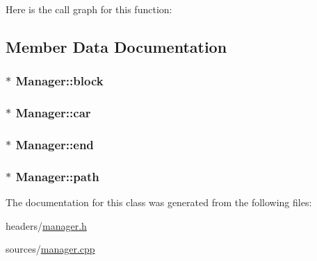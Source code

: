 Here is the call graph for this function\-:




\subsection{Member Data Documentation}
\hypertarget{class_manager_a9301f6e9bd2feee2719b2ff82b49a85e}{
\subsubsection[{block}]{$\ast$ Manager\-::block}}\label{class_manager_a9301f6e9bd2feee2719b2ff82b49a85e}
\hypertarget{class_manager_a2803dff8e8f2912242f4098991d91415}{
\subsubsection[{car}]{$\ast$ Manager\-::car}}\label{class_manager_a2803dff8e8f2912242f4098991d91415}
\hypertarget{class_manager_aec87028a71ab7b031977ac12a086658d}{
\subsubsection[{end}]{$\ast$ Manager\-::end}}\label{class_manager_aec87028a71ab7b031977ac12a086658d}
\hypertarget{class_manager_ad9b3bf0343fe49922b1874dcb2b5c6ca}{
\subsubsection[{path}]{$\ast$ Manager\-::path}}\label{class_manager_ad9b3bf0343fe49922b1874dcb2b5c6ca}


The documentation for this class was generated from the following files\-:\begin{DoxyCompactItemize}
\item 
headers/\hyperlink{manager_8h}{manager.\-h}\item 
sources/\hyperlink{manager_8cpp}{manager.\-cpp}\end{DoxyCompactItemize}
